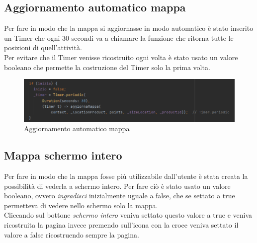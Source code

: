 \newpage

\subsection{Aggiornamento automatico mappa}
Per fare in modo che la mappa si aggiornasse in modo automatico è stato inserito un Timer che ogni 30 secondi va a chiamare la funzione che ritorna tutte le posizioni di quell'attività.\\
Per evitare che il Timer venisse ricostruito ogni volta è stato usato un valore booleano che permette la costruzione del Timer solo la prima volta.\\

\begin{figure}[htbp]	
	\centering
	\includegraphics[width=14cm]{immagini/automatico.png}
	\caption{Aggiornamento automatico mappa}
	\label{fig:Aggiornamento automatico mappa}
\end{figure}

\newpage

\subsection{Mappa schermo intero}
Per fare in modo che la mappa fosse più utilizzabile dall'utente è stata creata la possibilità di vederla a schermo intero.
Per fare ciò è stato usato un valore booleano, ovvero \textit{ingradisci} inizialmente uguale a false, che se settato a true permetteva di vedere nello schermo solo la mappa.\\
Cliccando sul bottone \textit{schermo intero} veniva settato questo valore a true e veniva ricostruita la pagina invece premendo sull'icona con la croce veniva settato il valore a false ricostruendo sempre la pagina.\\

